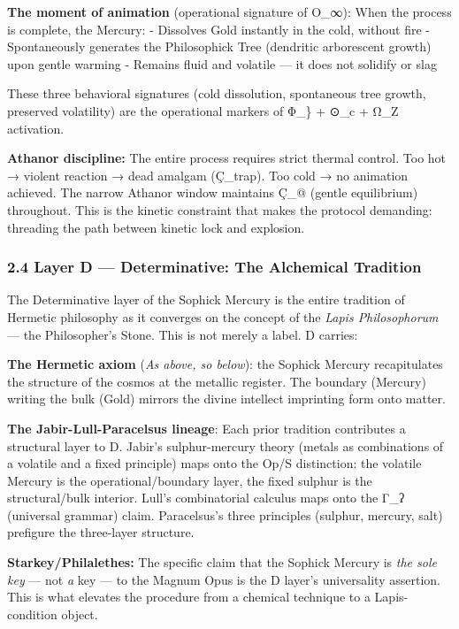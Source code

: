 \textbf{The moment of animation} (operational signature of O\_∞): When
the process is complete, the Mercury: - Dissolves Gold instantly in the
cold, without fire - Spontaneously generates the Philosophick Tree
(dendritic arborescent growth) upon gentle warming - Remains fluid and
volatile --- it does not solidify or slag

These three behavioral signatures (cold dissolution, spontaneous tree
growth, preserved volatility) are the operational markers of Φ\_\} +
⊙\_c + Ω\_Z activation.

\textbf{Athanor discipline:} The entire process requires strict thermal
control. Too hot → violent reaction → dead amalgam (Ç\_trap). Too cold →
no animation achieved. The narrow Athanor window maintains Ç\_@ (gentle
equilibrium) throughout. This is the kinetic constraint that makes the
protocol demanding: threading the path between kinetic lock and
explosion.

\subsubsection{2.4 Layer D --- Determinative: The Alchemical
Tradition}\label{layer-d-determinative-the-alchemical-tradition}

The Determinative layer of the Sophick Mercury is the entire tradition
of Hermetic philosophy as it converges on the concept of the \emph{Lapis
Philosophorum} --- the Philosopher's Stone. This is not merely a label.
D carries:

\textbf{The Hermetic axiom} (\emph{As above, so below}): the Sophick
Mercury recapitulates the structure of the cosmos at the metallic
register. The boundary (Mercury) writing the bulk (Gold) mirrors the
divine intellect imprinting form onto matter.

\textbf{The Jabir-Lull-Paracelsus lineage}: Each prior tradition
contributes a structural layer to D. Jabir's sulphur-mercury theory
(metals as combinations of a volatile and a fixed principle) maps onto
the Op/S distinction: the volatile Mercury is the operational/boundary
layer, the fixed sulphur is the structural/bulk interior. Lull's
combinatorial calculus maps onto the Γ\_ʔ (universal grammar) claim.
Paracelsus's three principles (sulphur, mercury, salt) prefigure the
three-layer structure.

\textbf{Starkey/Philalethes:} The specific claim that the Sophick
Mercury is \emph{the sole key} --- not \emph{a} key --- to the Magnum
Opus is the D layer's universality assertion. This is what elevates the
procedure from a chemical technique to a Lapis-condition object.

